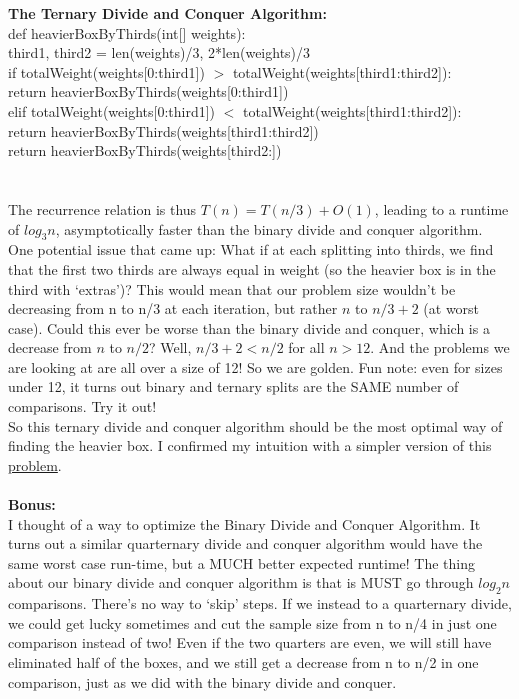 \documentclass[11pt]{article}
\begin{document}
\textbf{The Ternary Divide and Conquer Algorithm:}\\
def heavierBoxByThirds(int[] weights):\\
\indent	third1, third2 = len(weights)/3, 2*len(weights)/3\\
\indent	if totalWeight(weights[0:third1]) $>$ totalWeight(weights[third1:third2]):\\
\indent\indent return heavierBoxByThirds(weights[0:third1])\\
\indent	elif totalWeight(weights[0:third1]) $<$ totalWeight(weights[third1:third2]):\\
\indent\indent return heavierBoxByThirds(weights[third1:third2])\\
\indent	return heavierBoxByThirds(weights[third2:])\\
\\
\\
\indent The recurrence relation is thus $T(n) = T(n/3) + O(1)$, leading to a runtime of $log_3{n}$, asymptotically faster than the binary divide and conquer algorithm. \\
\indent One potential issue that came up: What if at each splitting into thirds, we find that the first two thirds are always equal in weight (so the heavier box is in the third with ‘extras’)? This would mean that our problem size wouldn’t be decreasing from n to n/3 at each iteration, but rather $n$ to $n/3 + 2$ (at worst case). Could this ever be worse than the binary divide and conquer, which is a decrease from $n$ to $n/2$?
\indent Well, $n/3 + 2 < n/2$ for all $n > 12$. And the problems we are looking at are all over a size of 12! So we are golden. Fun note: even for sizes under 12, it turns out binary and ternary splits are the SAME number of comparisons. Try it out!\\
\indent So this ternary divide and conquer algorithm should be the most optimal way of finding the heavier box. I confirmed my intuition with a simpler version of this \href{http://en.wikipedia.org/wiki/Balance_puzzle}{problem}.
\\\\
\textbf{Bonus:} \\
\indent I thought of a way to optimize the Binary Divide and Conquer Algorithm. It turns out a similar quarternary divide and conquer algorithm would have the same worst case run-time, but a MUCH better expected runtime! The thing about our binary divide and conquer algorithm is that is MUST go through $log_2{n}$ comparisons. There’s no way to ‘skip’ steps. If we instead to a quarternary divide, we could get lucky sometimes and cut the sample size from n to n/4 in just one comparison instead of two! Even if the two quarters are even, we will still have eliminated half of the boxes, and we still get a decrease from n to n/2 in one comparison, just as we did with the binary divide and conquer. \newline
\end{document}
